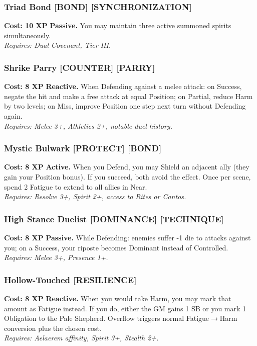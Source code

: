 \documentclass[12pt,a4paper]{book}
\begin{document}
\subsubsection*{Triad Bond \textnormal{[BOND] [SYNCHRONIZATION]}}
\label{talent:triad-bond}
\textbf{Cost: 10 XP} \textbf{Passive.} You may maintain three active summoned spirits simultaneously. \\
\textit{Requires: Dual Covenant, Tier III.}

\subsubsection*{Shrike Parry \textnormal{[COUNTER] [PARRY]}}
\label{talent:shrike-parry}
\textbf{Cost: 8 XP} \textbf{Reactive.} When Defending against a melee attack: on Success, negate the hit and make a free attack at equal Position; on Partial, reduce Harm by two levels; on Miss, improve Position one step next turn without Defending again. \\
\textit{Requires: Melee 3+, Athletics 2+, notable duel history.}

\subsubsection*{Mystic Bulwark \textnormal{[PROTECT] [BOND]}}
\label{talent:mystic-bulwark}
\textbf{Cost: 8 XP} \textbf{Active.} When you Defend, you may Shield an adjacent ally (they gain your Position bonus). If you succeed, both avoid the effect. Once per scene, spend 2 Fatigue to extend to all allies in Near. \\
\textit{Requires: Resolve 3+, Spirit 2+, access to Rites or Cantos.}

\subsubsection*{High Stance Duelist \textnormal{[DOMINANCE] [TECHNIQUE]}}
\label{talent:high-stance-duelist}
\textbf{Cost: 8 XP} \textbf{Passive.} While Defending: enemies suffer -1 die to attacks against you; on a Success, your riposte becomes Dominant instead of Controlled. \\
\textit{Requires: Melee 3+, Presence 1+.}

\subsubsection*{Hollow-Touched \textnormal{[RESILIENCE]}}
\label{talent:hollow-touched}
\textbf{Cost: 8 XP} \textbf{Reactive.} When you would take Harm, you may mark that amount as Fatigue instead. If you do, either the GM gains 1 SB or you mark 1 Obligation to the Pale Shepherd. Overflow triggers normal Fatigue$\rightarrow$Harm conversion plus the chosen cost. \\
\textit{Requires: Aelaerem affinity, Spirit 3+, Stealth 2+.}
\end{document}
